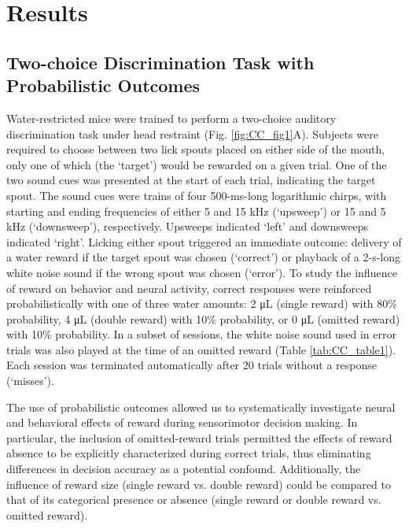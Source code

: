 \section{Results}

\subsection{Two-choice Discrimination Task with Probabilistic Outcomes}
Water-restricted mice were trained to perform a two-choice auditory discrimination task under head restraint (Fig. \ref{fig:CC_fig1}A). Subjects were required to choose between two lick spouts placed on either side of the mouth, only one of which (the ‘target’) would be rewarded on a given trial. One of the two sound cues was presented at the start of each trial, indicating the target spout. The sound cues were trains of four 500-ms-long logarithmic chirps, with starting and ending frequencies of either 5 and 15 kHz (‘upsweep’) or 15 and 5 kHz (‘downsweep’), respectively. Upsweeps indicated ‘left’ and downsweeps indicated ‘right’. Licking either spout triggered an immediate outcome: delivery of a water reward if the target spout was chosen (‘correct’) or playback of a 2-s-long white noise sound if the wrong spout was chosen (‘error’). To study the influence of reward on behavior and neural activity, correct responses were reinforced probabilistically with one of three water amounts: 2 \unit{\micro\liter} (single reward) with 80\% probability, 4 \unit{\micro\liter} (double reward) with 10\% probability, or 0 \unit{\micro\liter} (omitted reward) with 10\% probability. In a subset of sessions, the white noise sound used in error trials was also played at the time of an omitted reward (Table \ref{tab:CC_table1}). Each session was terminated automatically after 20 trials without a response (‘misses’).



The use of probabilistic outcomes allowed us to systematically investigate neural and behavioral effects of reward during sensorimotor decision making. In particular, the inclusion of omitted-reward trials permitted the effects of reward absence to be explicitly characterized during correct trials, thus eliminating differences in decision accuracy as a potential confound. Additionally, the influence of reward size (single reward vs. double reward) could be compared to that of its categorical presence or absence (single reward or double reward vs. omitted reward).

